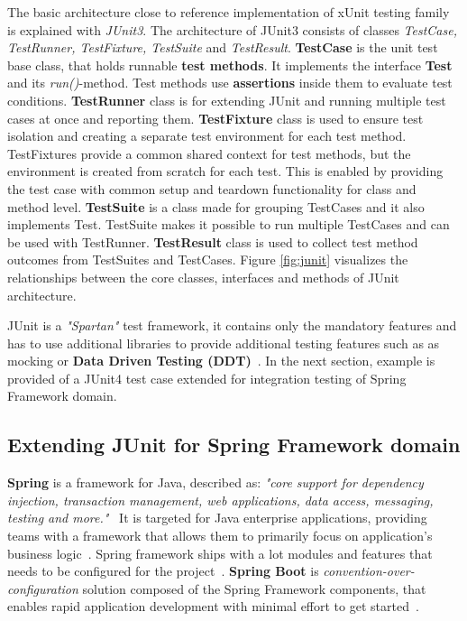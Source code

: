     The basic architecture close to reference implementation of xUnit testing family~\cite{hamill2004unit} is explained with
    \textit{JUnit3}. The architecture of JUnit3 consists of classes \textit{TestCase, TestRunner, TestFixture, TestSuite} and \textit{TestResult}.
    \textbf{TestCase} is the unit test base class, that holds runnable \textbf{test methods}.
    It implements the interface \textbf{Test} and its \textit{run()}-method. Test methods use \textbf{assertions} inside them to evaluate test conditions.
    \textbf{TestRunner} class is for extending JUnit and running multiple test cases at once and reporting
    them. \textbf{TestFixture} class is used to ensure test isolation and creating a separate test environment for each test method.
    TestFixtures provide a common shared context for test methods, but the environment is created from scratch for each test.
    This is enabled by providing the test case with common setup and teardown functionality for class and method level.
    \textbf{TestSuite} is a class made for grouping TestCases and it also implements Test. TestSuite makes it possible to run multiple TestCases and can
    be used with TestRunner. \textbf{TestResult} class is used to collect test method outcomes from TestSuites and TestCases.
    Figure \ref{fig:junit} visualizes the relationships between the core classes, interfaces and methods of JUnit architecture. ~\cite{hamill2004unit}

    JUnit is a \textit{"Spartan"} test framework, it contains only the mandatory features and has to use additional libraries
    to provide additional testing features such as as mocking or \textbf{Data Driven Testing (DDT)}~\cite{kapelonis2016java}.
    In the next section, example is provided of a JUnit4 test case extended for integration testing of Spring Framework domain.

    \subsection{Extending JUnit for Spring Framework domain}
    \label{section:junit-extend}
    \textbf{Spring} is a framework for Java, described as:
    \textit{"core support for dependency injection, transaction management, web applications, data access, messaging, testing and more."}~\cite{spring}
    It is targeted for Java enterprise applications, providing teams with a framework that allows them to primarily focus on
    application's business logic~\cite{spring}. Spring framework ships with a lot modules and features that needs to be
    configured for the project~\cite{wiki:spring}. \textbf{Spring Boot} is \textit{convention-over-configuration} solution
    composed of the Spring Framework components, that enables rapid application development with minimal effort to get started~\cite{wiki:spring}.

